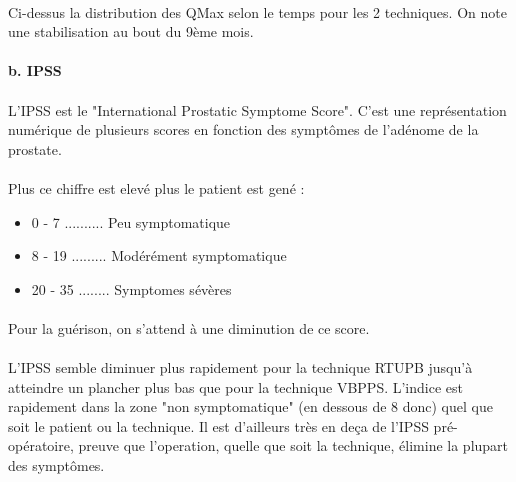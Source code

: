 \documentclass[11pt]{article}
\providecommand{\tightlist}{%
      \setlength{\itemsep}{0pt}\setlength{\parskip}{0pt}}
\begin{document}
    \begin{center}
    \end{center}
    
    
\paragraph{}Ci-dessus la distribution des QMax selon le temps pour les 2 techniques.
On note une stabilisation au bout du 9ème mois.

    \paragraph{b. IPSS}\label{b.-ipss}

\paragraph{}L'IPSS est le "International Prostatic Symptome Score". C'est une
représentation numérique de plusieurs scores en fonction des symptômes
de l'adénome de la prostate.
\paragraph{}
Plus ce chiffre est elevé plus le patient est gené :
\begin{itemize}
\tightlist
\item0 - 7 .......... Peu symptomatique
\item8 - 19 ......... Modérément symptomatique
\item20 - 35 ........ Symptomes sévères
\end{itemize}

\paragraph{}

Pour la guérison, on s'attend à une diminution de ce score.

    \begin{center}
    \end{center}
    
    
\paragraph{}
L'IPSS semble diminuer plus rapidement pour la technique RTUPB jusqu'à
atteindre un plancher plus bas que pour la technique VBPPS. L'indice est
rapidement dans la zone "non symptomatique" (en dessous de 8 donc) quel
que soit le patient ou la technique. Il est d'ailleurs très en deça de
l'IPSS pré-opératoire, preuve que l'operation, quelle que soit la
technique, élimine la plupart des symptômes. 
\end{document}
